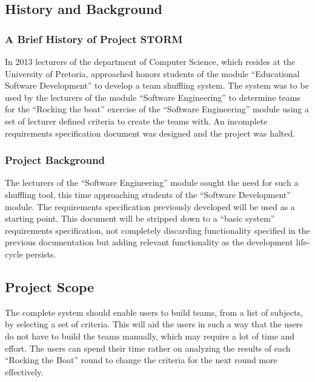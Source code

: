 \subsection{History and Background}
\subsubsection{A Brief History of Project STORM}
In 2013 lecturers of the department of Computer Science, which resides at the University of Pretoria,
approached honors students of the module ``Educational Software Development'' to develop a team
shuffling system. 
The system was to be used by the lecturers of the module ``Software Engineering'' to
determine teams for the ``Rocking the boat'' exercise of the ``Software Engineering'' module using a
set of lecturer defined criteria to create the teams with. An incomplete requirements specification document
was designed and the project was halted. 

\subsubsection{Project Background}
The lecturers of the ``Software Engineering'' module sought the need for such a shuffling tool, this
time approaching students of the ``Software Development'' module. The requirements specification previously 
developed will be used as a starting point. This document will be stripped down to a ``basic system'' requirements
specification, not completely discarding functionality specified in the previous documentation but adding relevant functionality
as the development life-cycle persists.

\subsection{Project Scope}
The complete system should enable users to build teams, from a list of subjects, by selecting a
set of criteria. This will aid the users in such a way that the users do not have to build the teams
manually, which may require a lot of time and effort. The users can spend their time rather on analyzing
the results of each ``Rocking the Boat'' round to change the criteria for the next round more
effectively.
